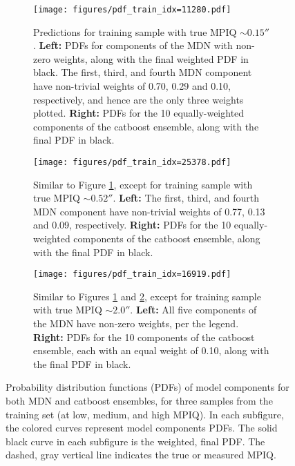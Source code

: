 \begin{figure*}
\begin{subfigure}{0.99\textwidth}
    \centering
    \texttt{[image: figures/pdf\_train\_idx=11280.pdf]}
    \caption{Predictions for training sample with true MPIQ $\sim0.15''$. \textbf{Left:} PDFs for components of the MDN with non-zero weights, along with the final weighted PDF in black. The first, third, and fourth MDN component have non-trivial weights of 0.70, 0.29 and 0.10, respectively, and hence are the only three weights plotted. \textbf{Right:} PDFs for the 10 equally-weighted components of the {\sc catboost} ensemble, along with the final PDF in black.}
    \label{fig:mdn_vs_cb_train_low}
\end{subfigure}
\newline
\begin{subfigure}{0.99\textwidth}
    \centering
    \texttt{[image: figures/pdf\_train\_idx=25378.pdf]}
    \caption{Similar to Figure \ref{fig:mdn_vs_cb_train_low}, except for training sample with true MPIQ $\sim0.52''$. \textbf{Left:} The first, third, and fourth MDN component have non-trivial weights of 0.77, 0.13 and 0.09, respectively.   \textbf{Right:} PDFs for the 10 equally-weighted components of the {\sc catboost} ensemble, along with the final PDF in black.}
    \label{fig:mdn_vs_cb_train_med}
\end{subfigure}
\newline
\begin{subfigure}{0.99\textwidth}
    \centering
    \texttt{[image: figures/pdf\_train\_idx=16919.pdf]}
    \caption{Similar to Figures \ref{fig:mdn_vs_cb_train_low} and \ref{fig:mdn_vs_cb_train_med}, except for training sample with true MPIQ $\sim2.0''$. \textbf{Left:} All five components of the MDN have non-zero weights, per the legend. \textbf{Right:} PDFs for the 10 components of the {\sc catboost} ensemble, each with an equal weight of 0.10, along with the final PDF in black.}
    \label{fig:mdn_vs_cb_train_high}
\end{subfigure}
\caption{Probability distribution functions (PDFs) of model components for both  MDN and {\sc catboost} ensembles, for three samples from the training set (at low, medium, and high MPIQ). In each subfigure, the colored curves represent model components PDFs.  The solid black curve in each subfigure is the weighted, final PDF.  The dashed, gray vertical line indicates the true or measured MPIQ.}
\label{fig:mdn_vs_cb_train}
\end{figure*}

